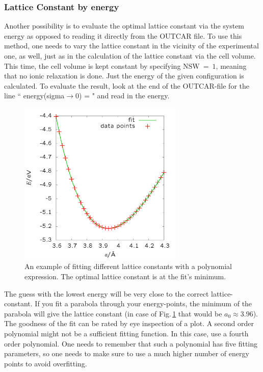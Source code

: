 \documentclass[twoside, 11pt, titlepage, captions=nooneline, a4paper, headsepline]{scrbook}%
\begin{document}
\subsubsection*{Lattice Constant by energy}
Another possibility is to evaluate the optimal lattice constant via the system energy as opposed to reading it directly from the OUTCAR file. To use this method, one needs to vary the lattice constant in the vicinity of the experimental one, as well, just as in the calculation of the lattice constant via the cell volume. This time, the cell volume is kept constant by specifying $ \mathrm{NSW}~=~1 $, meaning that no ionic relaxation is done. Just the energy of the given configuration is calculated. To evaluate the result, look at the end of the OUTCAR-file for the line `` energy(sigma$\rightarrow$0) = " and read in the energy.
\begin{figure}[h!!]
\centering
\includegraphics[width=0.7\textwidth]{Figures/BspFit.png}
\caption{An example of fitting different lattice constants with a polynomial expression. The optimal lattice constant is at the fit's minimum.}
\label{latfit}
\end{figure}
The guess with the lowest energy will be very close to the correct lattice-constant. If you fit a parabola through your energy-points, the minimum of the parabola will give the lattice constant (in case of Fig.\,\ref{latfit} that would be $a_0\approx3.96$). The goodness of the fit can be rated by eye inspection of a plot. A second order polynomial might not be a sufficient fitting function. In this case, use a fourth order polynomial. One needs to remember that such a polynomial has five fitting parameters, so one needs to make sure to use a much higher number of energy points to avoid overfitting. \\
\end{document}
